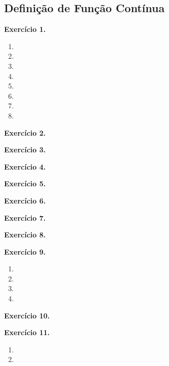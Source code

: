 \documentclass[12pt,a4paper]{article}
\begin{document}
\subsection{Definição de Função Contínua}

\vspace{0.5cm}
\noindent\textbf{Exercício 1.}
\begin{enumerate}
    \renewcommand{\theenumi}{\alph{enumi}}
    \renewcommand{\labelenumi}{\theenumi)}
    \item 
    \item 
    \item 
    \item 
    \item 
    \item 
    \item 
    \item 
\end{enumerate}

\vspace{0.5cm}
\noindent\textbf{Exercício 2.}

\vspace{0.5cm}
\noindent\textbf{Exercício 3.}

\vspace{0.5cm}
\noindent\textbf{Exercício 4.}

\vspace{0.5cm}
\noindent\textbf{Exercício 5.}

\vspace{0.5cm}
\noindent\textbf{Exercício 6.}

\vspace{0.5cm}
\noindent\textbf{Exercício 7.}

\vspace{0.5cm}
\noindent\textbf{Exercício 8.}

\vspace{0.5cm}
\noindent\textbf{Exercício 9.}
\begin{enumerate}
    \renewcommand{\theenumi}{\alph{enumi}}
    \renewcommand{\labelenumi}{\theenumi)}
    \item 
    \item 
    \item 
    \item 
\end{enumerate}

\vspace{0.5cm}
\noindent\textbf{Exercício 10.}

\vspace{0.5cm}
\noindent\textbf{Exercício 11.}
\begin{enumerate}
    \renewcommand{\theenumi}{\alph{enumi}}
    \renewcommand{\labelenumi}{\theenumi)}
    \item 
    \item 
\end{enumerate}
\end{document}
